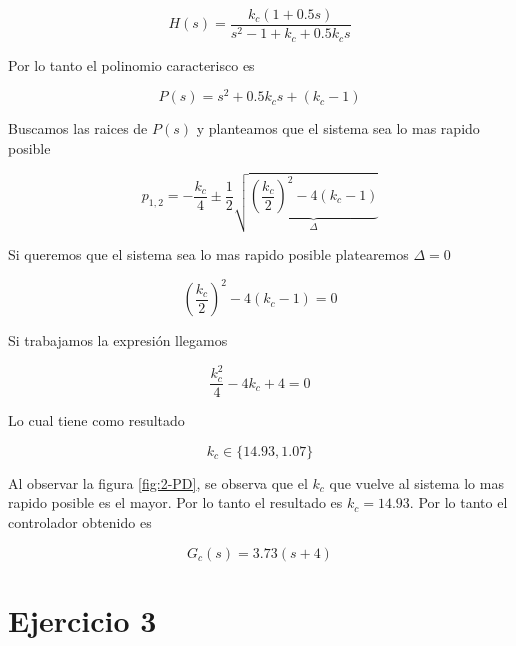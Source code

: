 \documentclass{article}
\begin{document}
        \begin{equation}
            H(s) = \frac{k_c ( 1 + 0.5s )}{s^2 - 1 + k_c + 0.5k_c s}
        \end{equation}

        Por lo tanto el polinomio caracterisco es 

        \begin{equation}
            P(s) = s^2  + 0.5k_c s + ( k_c - 1 )
        \end{equation}

        Buscamos las raices de $P(s)$ y planteamos que el sistema sea lo mas rapido posible

        \begin{equation}
            p_{1,2} = -\frac{ k_c }{4} \pm \frac{1}{2} \sqrt{ \underbrace{\left( \frac{k_c}{2} \right)^2 - 4 ( k_c - 1 )}_{\Delta} }
        \end{equation}

        Si queremos que el sistema sea lo mas rapido posible platearemos $\Delta=0$

        \begin{equation}
            \left( \frac{k_c}{2} \right)^2 - 4 ( k_c - 1 ) = 0
        \end{equation}

        Si trabajamos la expresión llegamos 

        \begin{equation}
            \frac{k_c^2}{4}  - 4 k_c + 4 = 0
        \end{equation}

        Lo cual tiene como resultado 

        \begin{equation}
            k_c \in \{ 14.93, 1.07 \}
        \end{equation}

        Al observar la figura \ref{fig:2-PD}, se observa que el $k_c$ que vuelve al sistema lo mas rapido posible es el mayor. Por lo 
        tanto el resultado es $k_c=14.93$. Por lo tanto el controlador obtenido es 

        \begin{equation}
            G_c(s) = 3.73 ( s + 4 )
        \end{equation}

    \section{Ejercicio 3}
\end{document}
